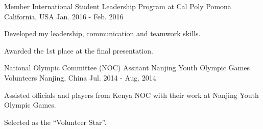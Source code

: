 

\begin{cventries}

  \cventry
    {Member} %
    {International Student Leadership Program at Cal Poly Pomona} %
    {California, USA} %
    {Jan. 2016 - Feb. 2016} %
    {
      \begin{cvitems} %
        \item {Developed my leadership, communication and teamwork skills.}
        \item {Awarded the 1st place at the final presentation.}
      \end{cvitems}
    }

  \cventry
    {National Olympic Committee (NOC) Assitant} %
    {Nanjing Youth Olympic Games Volunteers} %
    {Nanjing, China} %
    {Jul. 2014 - Aug. 2014} %
    {
      \begin{cvitems} %
        \item {Assisted officials and players from Kenya NOC with their work at Nanjing Youth Olympic Games.}
        \item {Selected as the ``Volunteer Star''.}
      \end{cvitems}
    }

    
\end{cventries}
